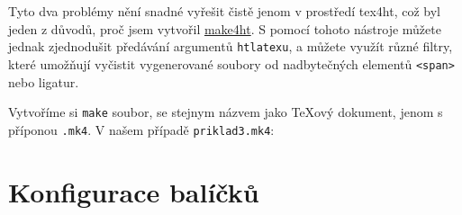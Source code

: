 \documentclass{article}
\begin{document}
Tyto dva problémy nění snadné vyřešit čistě jenom v prostředí \gls{tex4ht},
což byl jeden z důvodů, proč jsem vytvořil \href{https://github.com/michal-h21/make4ht}{make4ht}. S pomocí tohoto nástroje můžete jednak zjednodušit 
předávání argumentů \verb|htlatexu|, a můžete využít různé filtry, které 
umožňují vyčistit vygenerované soubory od nadbytečných elementů \verb|<span>|
nebo ligatur. 

Vytvoříme si \verb|make| soubor, se stejnym názvem jako \TeX ový dokument, 
jenom s příponou \verb|.mk4|. V našem případě \verb|priklad3.mk4|:



\section{Konfigurace balíčků}\label{sec:config}


\printglossary
\printbibliography
\end{document}
